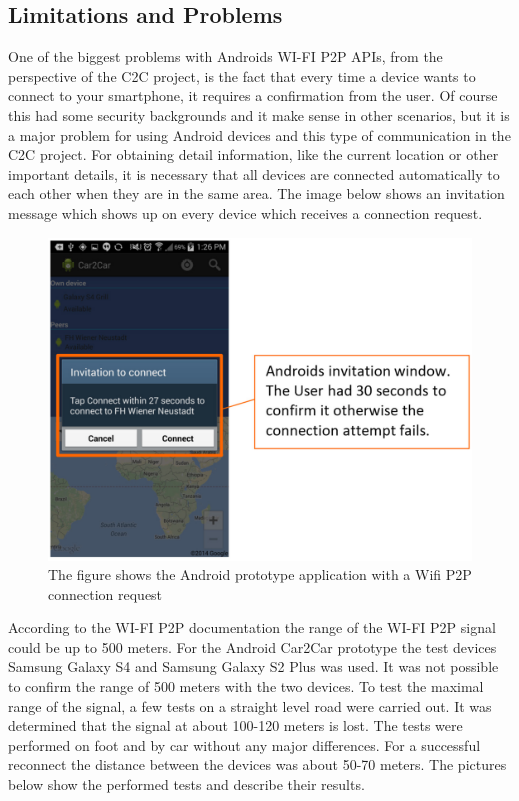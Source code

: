 \subsection*{Limitations and Problems}
\label{subsec:AndroidLimitationsProblems}
One of the biggest problems with Androids WI-FI P2P APIs, from the perspective of the C2C project, is the fact that every time a device wants to connect to your smartphone, it requires a confirmation from the user. Of course this had some security backgrounds and it make sense in other scenarios, but it is a major problem for using Android devices and this type of communication in the C2C project.  For obtaining detail information, like the current location or other important details, it is necessary that all devices are connected automatically to each other when they are in the same area. The image below shows an invitation message which shows up on every device which receives a connection request.
 
\begin{figure}[!hb]
	\centering
  \includegraphics[width=\linewidth,]{images/androidScreen3.eps}
	\caption{The figure shows the Android prototype application with a Wifi P2P connection request}
	\label{fig1}
\end{figure}

\noindent According to the WI-FI P2P documentation the range of the WI-FI P2P signal could be up to 500 meters. For the Android Car2Car prototype the test devices Samsung Galaxy S4 and Samsung Galaxy S2 Plus was used. It was not possible to confirm the range of 500 meters with the two devices. To test the maximal range of the signal, a few tests on a straight level road were carried out. It was determined that the signal at about 100-120 meters is lost. The tests were performed on foot and by car without any major differences. For a successful reconnect the distance between the devices was about 50-70 meters. The pictures below show the performed tests and describe their results.

